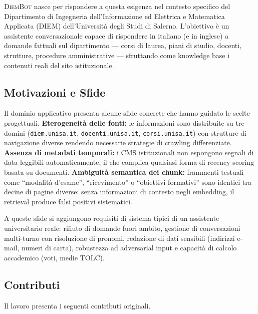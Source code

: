 \documentclass[11pt,a4paper]{article}
\newcommand{\sys}{\textsc{DiemBot}}
\begin{document}
\sys{} nasce per rispondere a questa esigenza nel contesto specifico del Dipartimento di
Ingegneria dell'Informazione ed Elettrica e Matematica Applicata (DIEM) dell'Università
degli Studi di Salerno. L'obiettivo è un assistente conversazionale capace di rispondere
in italiano (e in inglese) a domande fattuali sul dipartimento --- corsi di laurea, piani di
studio, docenti, strutture, procedure amministrative --- sfruttando come knowledge base
i contenuti reali del sito istituzionale.

\subsection{Motivazioni e Sfide}

Il dominio applicativo presenta alcune sfide concrete che hanno guidato le scelte
progettuali. \textbf{Eterogeneità delle fonti:} le informazioni sono distribuite su tre domini
(\texttt{diem.unisa.it}, \texttt{docenti.unisa.it}, \texttt{corsi.unisa.it}) con strutture di navigazione diverse rendendo necessarie strategie di crawling
differenziate. \textbf{Assenza di metadati temporali:} i CMS istituzionali non espongono
segnali di data leggibili automaticamente, il che complica qualsiasi forma
di recency scoring basata su documenti. \textbf{Ambiguità semantica dei chunk:} frammenti
testuali come ``modalità d'esame'', ``ricevimento'' o ``obiettivi formativi'' sono identici
tra decine di pagine diverse: senza informazioni di contesto negli embedding, il retrieval
produce falsi positivi sistematici.

A queste sfide si aggiungono requisiti di sistema tipici di un assistente universitario
reale: rifiuto di domande fuori ambito, gestione di conversazioni multi-turno con
risoluzione di pronomi, redazione di dati sensibili (indirizzi e-mail, numeri di carta),
robustezza ad adversarial input e capacità di calcolo accademico (voti, medie TOLC).

\subsection{Contributi}

Il lavoro presenta i seguenti contributi originali.
\end{document}
